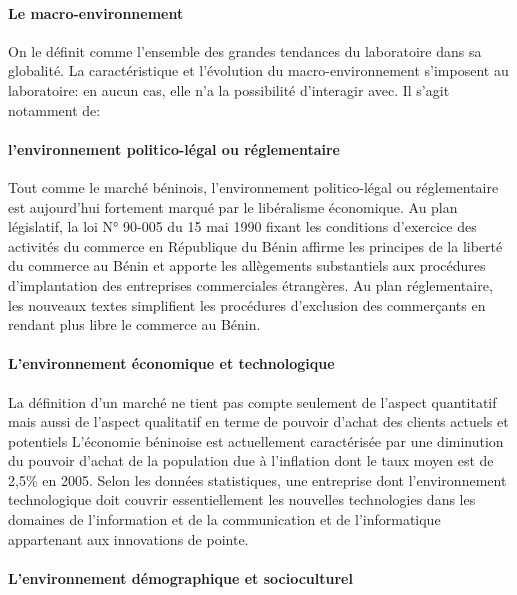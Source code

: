 \paragraph{Le macro-environnement}\label{le-macro-environnement}

On le définit comme l'ensemble des grandes tendances du laboratoire dans
sa globalité. La caractéristique et l'évolution du macro-environnement
s'imposent au laboratoire: en aucun cas, elle n'a la possibilité
d'interagir avec. Il s'agit notamment de:

\paragraph{l'environnement politico-légal ou
réglementaire}\label{lenvironnement-politico-luxe9gal-ou-ruxe9glementaire}

Tout comme le marché béninois, l'environnement politico-légal ou
réglementaire est aujourd'hui fortement marqué par le libéralisme
économique. Au plan législatif, la loi N° 90-005 du 15 mai 1990 fixant
les conditions d'exercice des activités du commerce en République du
Bénin affirme les principes de la liberté du commerce au Bénin et
apporte les allègements substantiels aux procédures d'implantation des
entreprises commerciales étrangères. Au plan réglementaire, les nouveaux
textes simplifient les procédures d'exclusion des commerçants en rendant
plus libre le commerce au Bénin.

\paragraph{L'environnement économique et
technologique}\label{lenvironnement-uxe9conomique-et-technologique}

La définition d'un marché ne tient pas compte seulement de l'aspect
quantitatif mais aussi de l'aspect qualitatif en terme de pouvoir
d'achat des clients actuels et potentiels L'économie béninoise est
actuellement caractérisée par une diminution du pouvoir d'achat de la
population due à l'inflation dont le taux moyen est de 2,5\% en 2005.
Selon les données statistiques, une entreprise dont l'environnement
technologique doit couvrir essentiellement les nouvelles technologies
dans les domaines de l'information et de la communication et de
l'informatique appartenant aux innovations de pointe.

\paragraph{L'environnement démographique et
socioculturel}\label{lenvironnement-duxe9mographique-et-socioculturel}

